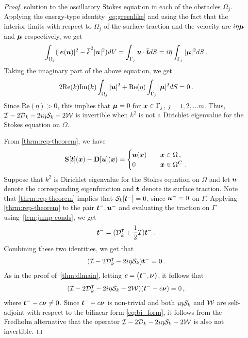 \begin{proof}
solution to the oscillatory Stokes equation in each
of the obstacles $\Omega_{j}$.
Applying the energy-type identity \cref{eq:greenlike}
and using the fact that 
the interior limits with respect to $\Omega_{j}$
of the surface traction and the velocity
are $i\eta {\boldsymbol \mu}$ and ${\boldsymbol \mu}$ respectively, we get
\begin{equation}
\int_{\Omega_{j}} (|{\boldsymbol e}({\boldsymbol u})|^{2} - \overline{k}^{2} |{\boldsymbol u}|^2) dV 
= \int_{\Gamma_{j}} {\boldsymbol u} \cdot \overline{{\boldsymbol t}} dS = 
i\overline{\eta}\int_{\Gamma_{j}} |{\boldsymbol \mu}|^2 dS \, .
\end{equation}
Taking the imaginary part of the above equation,
we get
\begin{equation}
2 \text{Re}(k) \text{Im}(k) \int_{\Omega_{j}} |{\boldsymbol u}|^2 + \text{Re}(\eta)
\int_{\Gamma_{j}} |{\boldsymbol \mu}|^2 dS = 0 \, .
\end{equation}
Since $\text{Re}(\eta)>0$, this implies that
${\boldsymbol \mu}=0$ for ${\boldsymbol x} \in \Gamma_{j}$, $j=1,2,\ldots m$. 
Thus, $\mathcal I - 2{\mathcal D}_{k} -2i\eta{\mathcal S}_{k} -2{\mathcal W}$ is
invertible when $k^2$ is not a Dirichlet eigenvalue
for the Stokes equation on $\Omega$.

From \cref{thrm:rep-theorem}, we have 
\begin{equation} 
  {\bf S} [{\boldsymbol t}]({\boldsymbol x}) - {\bf D}[{\boldsymbol u}]({\boldsymbol x}) = \begin{cases} 
    {\boldsymbol u}({\boldsymbol x}) &\quad {\boldsymbol x} \in \Omega \, , \\
    0 &\quad {\boldsymbol x} \in \Omega^{C} \; .
    \end{cases}
  \end{equation}
Suppose that $k^2$ is Dirichlet eigenvalue for
the Stokes equation on $\Omega$ and let ${\boldsymbol u}$
denote the corresponding eigenfunction and ${\boldsymbol t}$ denote
its surface traction. Note that \cref{thrm:rep-theorem}
implies that ${\mathcal S}_{k}[{\boldsymbol t}^{-}] = 0$, since
${\boldsymbol u}^{-}=0$ on $\Gamma$. Applying \cref{thrm:rep-theorem}
to the pair ${\boldsymbol t}^{-}, {\boldsymbol u}^{-}$ and evaluating the
traction on $\Gamma$ using~\cref{lem:jump-conds},
we get
\begin{equation}
{\boldsymbol t}^{-} = ({\mathcal D}^{\intercal}_{k} + \frac{1}{2} \mathcal I) {\boldsymbol t}^{-} \, . 
\end{equation}
Combining these two identities, we get
that
\begin{equation}
(\mathcal I - 2{\mathcal D}_{k}^{\intercal} -2i\eta {\mathcal S}_{k}) {\boldsymbol t}^{-} = 0 \, .
\end{equation}
As in the proof of~\cref{thm:dlmain}, letting
$c = \left< {\boldsymbol t}^{-} ,{\boldsymbol \nu} \right>$, it follows that
\begin{equation}
  (\mathcal I - 2{\mathcal D}_{k}^{\intercal} - 2i \eta {\mathcal S}_{k} - 2{\mathcal W})
  ({\boldsymbol t}^{-} - c{\boldsymbol \nu}) = 0 \, ,
\end{equation}
where ${\boldsymbol t}^{-} - c{\boldsymbol \nu} \neq 0$.
Since ${\boldsymbol t}^{-} - c{\boldsymbol \nu}$ is non-trivial and both
$i\eta {\mathcal S}_{k}$ and ${\mathcal W}$ are self-adjoint with respect
to the bilinear form \cref{eq:bi_form},
it follows from the Fredholm alternative
that the operator $\mathcal I - 2{\mathcal D}_{k} -2i\eta {\mathcal S}_k - 2{\mathcal W}$
is also not invertible.
\end{proof}


